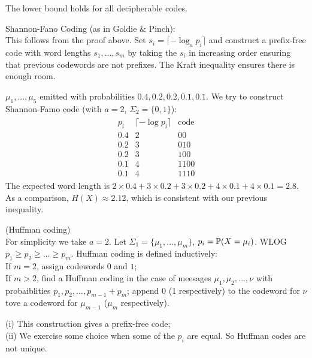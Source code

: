 \documentclass[a4paper]{article}
\begin{document}
\begin{rem}
The lower bound holds for all decipherable codes.
\end{rem}

Shannon-Fano Coding (as in Goldie $\&$ Pinch):\\
This follows from the proof above. Set $s_i = \lceil -\log_a p_i\rceil$ and construct a prefix-free code with word lengths $s_1,...,s_m$ by taking the $s_i$ in increasing order ensuring that previous codewords are not prefixes. The Kraft inequality ensures there is enough room.

\begin{eg}
$\mu_1,...,\mu_5$ emitted with probabilities $0.4,0.2,0.2,0.1,0.1$. We try to construct Shannon-Famo code (with $a=2$, $\Sigma_2 = \{0,1\}$):
\begin{equation*}
\begin{aligned}
\begin{matrix}
p_i & \lceil -\log p_i\rceil & \text{code}\\
0.4 & 2 & 00\\
0.2 & 3 & 010\\
0.2 & 3 & 100\\
0.1 & 4 & 1100\\
0.1 & 4 & 1110
\end{matrix}
\end{aligned}
\end{equation*}
The expected word length is $2 \times 0.4 + 3 \times 0.2 + 3 \times 0.2 + 4 \times 0.1 + 4 \times 0.1 = 2.8$.\\
As a comparison, $H(X) \approx 2.12$, which is consistent with our previous inequality.
\end{eg}

\begin{defi} (Huffman coding)\\
For simplicity we take $a=2$. Let $\Sigma_1 = \{\mu_1,...,\mu_m\}$, $p_i = \P(X=\mu_i)$. WLOG $p_1 \geq p_2 \geq ... \geq p_m$.  Huffman coding is defined inductively:\\
If $m=2$, assign codewords $0$ and $1$;\\
If $m>2$, find a Huffman coding in the case of meesages $\mu_1,\mu_2,...,\nu$ with probaiblities $p_1,p_2,...,p_{m-1}+p_m$; append $0$ (1 respectively) to the codeword for $\nu$ tove a codeword for $\mu_{m-1}$ ($\mu_m$ respectively).
\end{defi}

\begin{rem}
(i) This construction gives a prefix-free code;\\
(ii) We exercise some choice when some of the $p_i$ are equal. So Huffman codes are not unique.
\end{rem}
\end{document}
